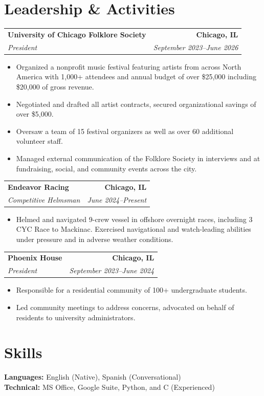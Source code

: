 \documentclass[10pt,letterpaper]{article}
\makeatletter
\newcommand{\resumeEntry}[4]{%
  \begin{tabularx}{\textwidth}{@{}X r@{}}
    \textbf{#1} & \textbf{#2} \\
    \textit{#3} & \textit{#4}
  \end{tabularx}
  \vspace{-0.25em}
}
\makeatother
\begin{document}
\section{Leadership \& Activities}

\resumeEntry
  {University of Chicago Folklore Society}{Chicago, IL}
  {President}{September 2023--June 2026}
\begin{itemize}
  \item Organized a nonprofit music festival featuring artists from across North America with 1,000+ attendees and annual budget of over \$25,000 including \$20,000 of gross revenue.
  \item Negotiated and drafted all artist contracts, secured organizational savings of over \$5,000.
  \item Oversaw a team of 15 festival organizers as well as over 60 additional volunteer staff.
  \item Managed external communication of the Folklore Society in interviews and at fundraising, social, and community events across the city.
\end{itemize}

\resumeEntry
  {Endeavor Racing}{Chicago, IL}
  {Competitive Helmsman}{June 2024--Present}
\begin{itemize}
  \item Helmed and navigated 9-crew vessel in offshore overnight races, including 3 CYC Race to Mackinac. Exercised navigational and watch-leading abilities under pressure and in adverse weather conditions.
\end{itemize}

\resumeEntry
  {Phoenix House}{Chicago, IL}
  {President}{September 2023--June 2024}
\begin{itemize}
  \item Responsible for a residential community of 100+ undergraduate students.
  \item Led community meetings to address concerns, advocated on behalf of residents to university administrators.
\end{itemize}

\section{Skills}

\textbf{Languages:} English (Native), Spanish (Conversational)\\
\textbf{Technical:} MS Office, Google Suite, Python, and C (Experienced)
\end{document}
